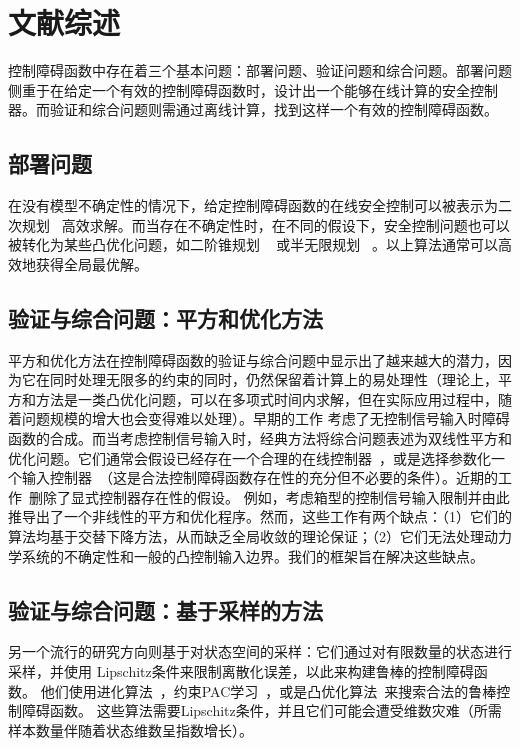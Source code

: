 
\chapter{文献综述}
\label{sec:relatedwork}

控制障碍函数中存在着三个基本问题：部署问题、验证问题和综合问题。部署问题侧重于在给定一个有效的控制障碍函数时，设计出一个能够在线计算的安全控制器。而验证和综合问题则需通过离线计算，找到这样一个有效的控制障碍函数。

\section{部署问题} 
在没有模型不确定性的情况下，给定控制障碍函数的在线安全控制可以被表示为二次规划 ~\cite{ames2014cdc-cbforigin}高效求解。而当存在不确定性时，在不同的假设下，安全控制问题也可以被转化为某些凸优化问题，如二阶锥规划 ~\cite{long2022ral-robustsocp,dhiman2021tac-robustsocp} 或半无限规划~\cite{wei2022acc-uncertainsynthesis} 。以上算法通常可以高效地获得全局最优解。

\section{验证与综合问题：平方和优化方法}
平方和优化方法在控制障碍函数的验证与综合问题中显示出了越来越大的潜力，因为它在同时处理无限多的约束的同时，仍然保留着计算上的易处理性（理论上，平方和方法是一类凸优化问题，可以在多项式时间内求解，但在实际应用过程中，随着问题规模的增大也会变得难以处理）。早期的工作\cite{prajna2004hscc-bfsynthesis,prajna2006automatica-bfsynthesis} 考虑了无控制信号输入时障碍函数的合成。而当考虑控制信号输入时，经典方法将综合问题表述为双线性平方和优化问题。它们通常会假设已经存在一个合理的在线控制器~\cite{ames2019ecc-cbftheapp}，或是选择参数化一个输入控制器~\cite{wang2022arxiv-safetysynver}（这是合法控制障碍函数存在性的充分但不必要的条件）。近期的工作~\cite{clark22arxiv-cbf,dai2022arxiv-clfcbfsynveri,zhao22arxiv-cbfsos}删除了显式控制器存在性的假设。 例如，\cite{zhao22arxiv-cbfsos}考虑箱型的控制信号输入限制并由此推导出了一个非线性的平方和优化程序。然而，这些工作有两个缺点：（1）它们的算法均基于交替下降方法，从而缺乏全局收敛的理论保证；（2）它们无法处理动力学系统的不确定性和一般的凸控制输入边界。我们的框架旨在解决这些缺点。

\section{验证与综合问题：基于采样的方法}
另一个流行的研究方向则基于对状态空间的采样：它们通过对有限数量的状态进行采样，并使用 Lipschitz条件来限制离散化误差，以此来构建鲁棒的控制障碍函数。 他们使用进化算法~\cite{wei2022acc-uncertainsynthesis}，约束PAC学习~\cite{robey2021ifac-rcbfhybrid}，或是凸优化算法~\cite{lindemann2021arxiv-rcbfsafeexpert}来搜索合法的鲁棒控制障碍函数。 这些算法需要Lipschitz条件，并且它们可能会遭受维数灾难（所需样本数量伴随着状态维数呈指数增长）。

